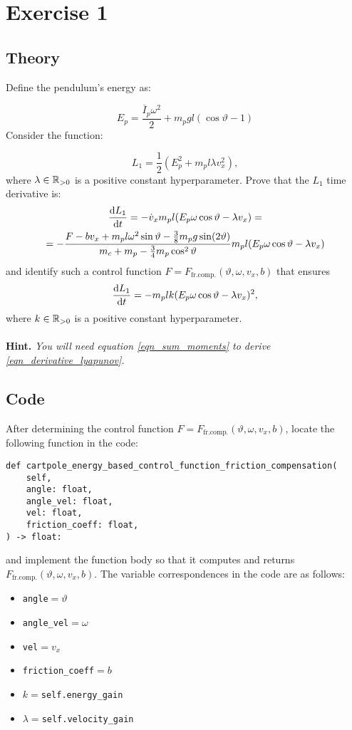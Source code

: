 \documentclass[12pt]{article}
\begin{document}
\section*{Exercise 1}
\subsection*{Theory}
Define the pendulum's energy as:

$$
E_p =  \frac{\overline{I}_p \omega ^ 2}{2}   + m_p g l (\cos{\vartheta} - 1)
$$
Consider the function:

\begin{equation}
    L_1 = \frac{1}{2}(E_p^2 + m_p l\lambda v_x ^ 2),
\end{equation}
where $\lambda \in {\mathbb{R}}_{> 0}$ is a positive constant hyperparameter. 
Prove that the $L_1$ time derivative is: 
\begin{multline}
\label{eqn_derivative_lyapunov}
\frac{\mathop{}\!\mathrm{d} L_1}{\mathop{}\!\mathrm{d} t} = - \dot{v}_x m_p l (E_p \omega \cos \vartheta - \lambda v_x) = \\ 
= -\frac{F - b v_x + m_p l \omega ^2 \sin{\vartheta} - \frac{3}{8}m_p g\sin(2\vartheta)}{m_c + m_p - \frac{3}{4} m_p \cos ^ 2 \vartheta} m_p l (E_p \omega \cos \vartheta - \lambda v_x)
\end{multline}
and identify such a control function $F = F_{\text{fr.comp.}}(\vartheta, \omega, v_x, b)$ that ensures 
$$
\frac{\mathop{}\!\mathrm{d} L_1}{\mathop{}\!\mathrm{d} t} = - m_p lk (E_p\omega \cos \vartheta  - \lambda v_x)^2,
$$
where $k\in {\mathbb{R}}_{> 0}$ is a positive constant hyperparameter.
\\
\\
\textbf{Hint.} \textit{You will need equation \eqref{eqn_sum_moments} to derive \eqref{eqn_derivative_lyapunov}.}

\subsection*{Code}
After determining the control function $F = F_{\text{fr.comp.}}(\vartheta, \omega, v_x, b)$, locate the following function in the code:
\begin{verbatim}
def cartpole_energy_based_control_function_friction_compensation(
    self,
    angle: float, 
    angle_vel: float, 
    vel: float, 
    friction_coeff: float, 
) -> float:
\end{verbatim}
and implement the function body so that it computes and returns $F_{\text{fr.comp.}}(\vartheta, \omega, v_x, b)$. The variable correspondences in the code are as follows:
\begin{itemize}
    \item \texttt{angle}$=\vartheta$
    \item \texttt{angle\_vel}$=\omega$
    \item \texttt{vel}$=v_x$
    \item \texttt{friction\_coeff}$=b$ 
    \item $k=$\texttt{self.energy\_gain}
    \item $\lambda=$\texttt{self.velocity\_gain}
\end{itemize}
\end{document}
